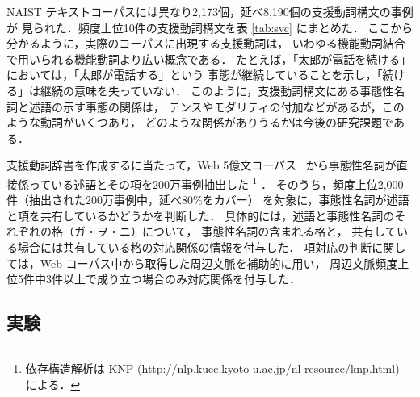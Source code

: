 \documentclass[japanese]{jnlp_1.4}
\begin{document}
\begin{table}[b]
\label{tab:svc}

\end{table}

NAIST テキストコーパスには異なり2,173個，延べ8,190個の支援動詞構文の事例が
見られた．頻度上位10件の支援動詞構文を表 \ref{tab:svc} にまとめた．
ここから分かるように，実際のコーパスに出現する支援動詞は，
いわゆる機能動詞結合で用いられる機能動詞より広い概念である．
たとえば，「太郎が電話を続ける」においては，「太郎が電話する」という
事態が継続していることを示し，「続ける」は継続の意味を失っていない．
このように，支援動詞構文にある事態性名詞と述語の示す事態の関係は，
テンスやモダリティの付加などがあるが，このような動詞がいくつあり，
どのような関係がありうるかは今後の研究課題である．

\begin{table}[t]
    \label{tab:suru:template}

\end{table}
\begin{table}[t]
    \label{tab:oshieru:template}

\end{table}

支援動詞辞書を作成するに当たって，Web 5億文コーパス~\cite{kawahara:2006:LREC}
から事態性名詞が直接係っている述語とその項を200万事例抽出した
\footnote{依存構造解析は KNP
(http://nlp.kuee.kyoto-u.ac.jp/nl-resource/knp.html) による．}
．
そのうち，頻度上位2,000件（抽出された200万事例中，延べ80\%をカバー）
を対象に，事態性名詞が述語と項を共有しているかどうかを判断した．
具体的には，述語と事態性名詞のそれぞれの格（ガ・ヲ・ニ）について，
事態性名詞の含まれる格と，
共有している場合には共有している格の対応関係の情報を付与した．
項対応の判断に関しては，Web コーパス中から取得した周辺文脈を補助的に用い，
周辺文脈頻度上位5件中3件以上で成り立つ場合のみ対応関係を付与した．


\subsection{実験}
\label{subsec:exp:syntax}
\end{document}
